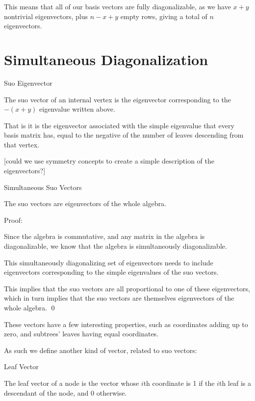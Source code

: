 \documentclass[10pt,a4paper]{report}
\begin{document}
This means that all of our basis vectors are fully diagonalizable, as we have
$x+y$ nontrivial eigenvectors, plus $n-x+y$ empty rows, giving a total of $n$
eigenvectors.

\section{Simultaneous Diagonalization}

\begin{definition} Suo Eigenvector

	The suo vector of an internal vertex is the eigenvector corresponding to
	the $-(x+y)$ eigenvalue written above.

	That is it is the eigenvector associated with the simple eigenvalue that
	every basis matrix has, equal to the negative of the number of leaves
	descending from that vertex.
\end{definition}

[could we use symmetry concepts to create a simple description of the eigenvectors?]

\begin{lemma} Simultaneous Suo Vectors

	The suo vectors are eigenvectors of the whole algebra.
\end{lemma}
Proof:

Since the algebra is commutative, and any matrix in the algebra is
diagonalizable, we know that the algebra is simultaneously diagonalizable.

This simultaneously diagonalizing set of eigenvectors needs to include
eigenvectors corresponding to the simple eigenvalues of the suo vectors.

This implies that the suo vectors are all proportional to one of these
eigenvectors, which in turn implies that the suo vectors are themselves
eigenvectors of the whole algebra. \qed

These vectors have a few interesting properties, such as coordinates adding up
to zero, and subtrees' leaves having equal coordinates.

As such we define another kind of vector, related to suo vectors:

\begin{definition} Leaf Vector

	The leaf vector of a node is the vector whose $i$th coordinate is 1 if the
	$i$th leaf is a descendant of the node, and 0 otherwise.
\end{definition}
\end{document}
